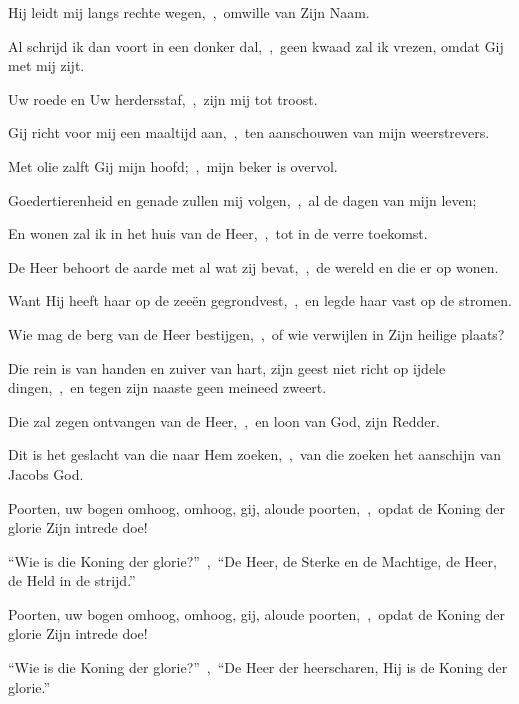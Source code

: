 \documentclass[12pt,twoside,a5paper]{article}
\begin{document}
\begin{halfparskip}
  Hij leidt mij langs rechte wegen,~\sep\ omwille van Zijn Naam.

  Al schrijd ik dan voort in een donker dal,~\sep\ geen kwaad zal ik vrezen, omdat Gij met mij zijt.

  Uw roede en Uw herdersstaf,~\sep\ zijn mij tot troost.

  Gij richt voor mij een maaltijd aan,~\sep\ ten aanschouwen van mijn weerstrevers.

  Met olie zalft Gij mijn hoofd;~\sep\ mijn beker is overvol.

  Goedertierenheid en genade zullen mij volgen,~\sep\ al de dagen van mijn leven;

  En wonen zal ik in het huis van de Heer,~\sep\ tot in de verre toekomst.

    De Heer behoort de aarde met al wat zij bevat,~\sep\ de wereld en die er op wonen.

  Want Hij heeft haar op de zeeën gegrondvest,~\sep\ en legde haar vast op de stromen.

  Wie mag de berg van de Heer bestijgen,~\sep\ of wie verwijlen in Zijn heilige plaats?

  Die rein is van handen en zuiver van hart, zijn geest niet richt op ijdele dingen,~\sep\ en tegen zijn naaste geen meineed zweert.

  Die zal zegen ontvangen van de Heer,~\sep\ en loon van God, zijn Redder.

  Dit is het geslacht van die naar Hem zoeken,~\sep\ van die zoeken het aanschijn van Jacobs God.

  Poorten, uw bogen omhoog, omhoog, gij, aloude poorten,~\sep\ opdat de Koning der glorie Zijn intrede doe!

  ``Wie is die Koning der glorie?''~\sep\ ``De Heer, de Sterke en de Machtige, de Heer, de Held in de strijd.''

  Poorten, uw bogen omhoog, omhoog, gij, aloude poorten,~\sep\ opdat de Koning der glorie Zijn intrede doe!

  ``Wie is die Koning der glorie?''~\sep\ ``De Heer der heerscharen, Hij is de Koning der glorie.''
\end{halfparskip}
\end{document}
